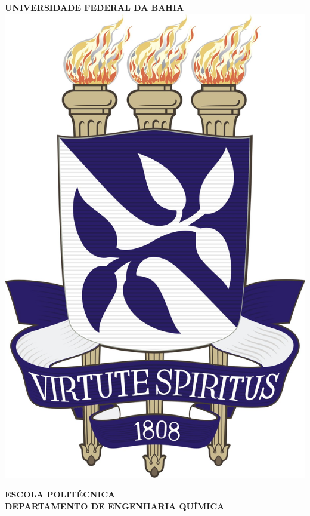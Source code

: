 \documentclass[12pt, a4paper]{article}
\begin{document}
    \begin{titlepage}
        \centering
        
        
        
        \textbf{\large UNIVERSIDADE FEDERAL DA BAHIA} \\
        \vspace*{1.5cm}
        \includegraphics[width=1.0\textwidth, height=0.4\textheight, keepaspectratio]{brasao_ufba.jpg}

        \vspace*{1.5cm}

        \textbf{\large ESCOLA POLITÉCNICA} \\
        \textbf{\large DEPARTAMENTO DE ENGENHARIA QUÍMICA} \\
        

\end{titlepage}
\end{document}
